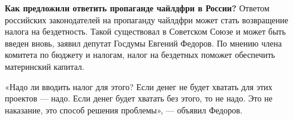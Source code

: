 \textbf{Как предложили ответить пропаганде чайлдфри в России?}
Ответом российских законодателей на пропаганду чайлдфри может
стать возвращение налога на бездетность.
Такой существовал в Советском Союзе и может быть введен вновь,
заявил депутат Госдумы Евгений Федоров. По мнению члена комитета
по бюджету и налогам, налог на бездетных поможет обеспечить
материнский капитал.

«Надо ли вводить налог для этого?
Если денег не будет хватать для этих проектов --- надо.
Если денег будет хватать без этого, то не надо.
Это не наказание, это способ решения проблемы»,
--- объявил Федоров.
